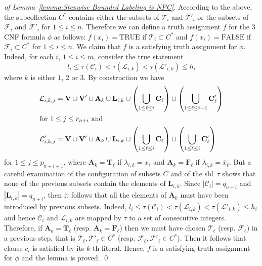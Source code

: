 \documentclass[a4paper,10pt]{llncs}
\newcommand{\SBL}{sbl}
\begin{document}
\begin{proof}[of Lemma~\ref{lemma:Stepwise Bounded Labeling is NPC}]
  According to the above, 
  the subcollection $C^*$ contains either the subsets of $\mathcal{T}_i$ and $\mathcal{T}'_i$ 
  or the subsets of $\mathcal{F}_i$ and $\mathcal{F}'_i$ for $1 \leq i \leq n$. 
  Therefore we can define a truth assignment $f$ for the $3$CNF formula $\phi$ as follows: 
  $f(x_i) = \mbox{TRUE}$ if $\mathcal{T}_i \subset C^*$ and $f(x_i) = \mbox{FALSE}$ 
  if $\mathcal{F}_i \subset C^*$ for $1 \leq i \leq n$. 
  We claim that $f$ is a satisfying truth assignment for $\phi$. 
  Indeed, for each $i$, $1 \leq i \leq m$, consider the true statement
  $$
  l_i \leq \tau(\mathcal{C}_i) < \tau(\mathcal{L}_{i, k}) < \tau(\mathcal{L}'_{i, k}) \leq h_i
  $$
  where $k$ is either $1$, $2$ or $3$. By construction we have
  \begin{align*}
    \mathcal{L}_{i, k, j}  &= \mathbf{V} \cup \mathbf{V}' \cup \mathbf{A}_k \cup \mathbf{L}_{i, k} \cup \left( \bigcup_{1 \leq \ell \leq i} \mathbf{C}_\ell \right) \cup \left( \bigcup_{1 \leq \ell \leq i-1} \mathbf{C}'_\ell \right) \\
    \intertext{for $1 \leq j \leq r_{n+i}$ and}
    \mathcal{L}'_{i, k, j} &= \mathbf{V} \cup \mathbf{V}' \cup \mathbf{A}_k \cup \mathbf{L}_{i, k} \cup \left( \bigcup_{1 \leq \ell \leq i} \mathbf{C}_\ell \right) \cup \left( \bigcup_{1 \leq \ell \leq i} \mathbf{C}'_\ell \right) 
  \end{align*}
  for $1 \leq j \leq p_{n+i+1}$, where $\mathbf{A}_k = \mathbf{T}_\ell$
  if $\lambda_{i, k} = x_\ell$ and $\mathbf{A}_k = \mathbf{F}_\ell$ if
  $\lambda_{i, k} = \overline{x}_\ell$. But a careful examination of the
  configuration of subsets $C$ and of the \SBL\
  $\tau$ shows that none of the previous subsets contain the elements of
  $\mathbf{L}_{i, k}$. Since $|\mathcal{C}_i| = q_{n+i}$ and
  $|\mathbf{L}_{i, k}| = q_{n+i}$, then it follows that all the elements
  of $\mathbf{A}_k$ must have been introduced by previous
  subsets. Indeed, $l_i \leq \tau(\mathcal{C}_i) < \tau(\mathcal{L}_{i,
    k}) < \tau(\mathcal{L}'_{i, k}) \leq h_i$ and hence $\mathcal{C}_i$
  and $\mathcal{L}_{i, k}$ are mapped by $\tau$ to a set of consecutive
  integers. Therefore, if $\mathbf{A}_k = \mathbf{T}_\ell$
  (resp. $\mathbf{A}_k = \mathbf{F}_\ell$) then we must have chosen
  $\mathcal{T}_\ell$ (resp. $\mathcal{F}_\ell$) in a previous step, that
  is $\mathcal{T}_\ell, \mathcal{T}'_\ell \in C^*$
  (resp. $\mathcal{F}_\ell, \mathcal{F}'_\ell \in C^*$). Then it follows
  that clause $c_i$ is satisfied by its $k$-th literal. Hence, $f$ is a
  satisfying truth assignment for $\phi$ and the lemma is proved. 
\qed
\end{proof}
\end{document}
